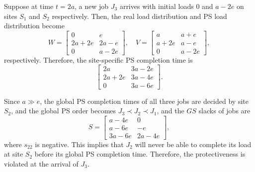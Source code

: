 Suppose at time $t=2a$, a new job $J_3$ arrives with initial loads $0$ and $a-2e$ on sites $S_1$ and $S_2$ respectively. Then, the real load distribution and PS load distribution become 
\begin{equation}
    W = \begin{bmatrix} 0 & e  \\ 2a+2e & 2a-e \\ 0 & a-2e \end{bmatrix}, \quad V = \begin{bmatrix} a & a+e \\ a+2e & a-e \\ 0 & a-2e \end{bmatrix},
\end{equation}
respectively. Therefore, the site-specific PS completion time is 
\begin{equation}
    \begin{bmatrix} 2a & 3a-2e \\ 2a+2e & 3a-4e \\ 0 & 3a-6e \end{bmatrix}. 
\end{equation}

Since $a \gg e$, the global PS completion times of all three jobs are decided by site $S_2$, and the global PS order becomes $J_3 \prec J_2 \prec J_1$, and the $GS$ slacks of jobs are 
\begin{equation}
    S = \begin{bmatrix} a-4e & 0 \\ a-6e & -e \\ 3a-6e & 2a-4e \end{bmatrix},
\end{equation}
where $s_{22}$ is negative. This implies that $J_2$ will never be able to complete its load at site $S_2$ before its global PS completion time. Therefore, the protectiveness is violated at the arrival of $J_3$. %

